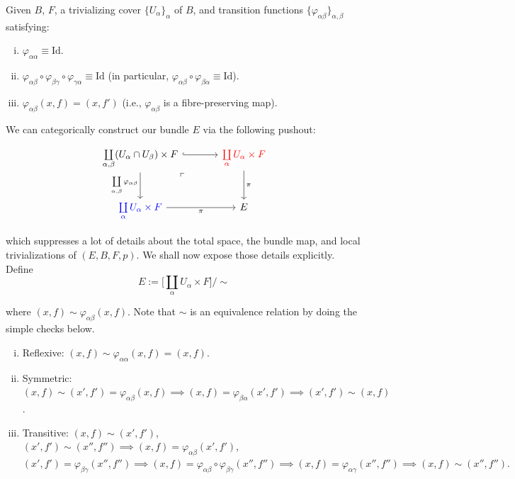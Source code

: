 \documentclass[11pt,a4paper]{article}
\begin{document}
Given $B$, $F$, a trivializing cover $\{U_{\alpha}\}_{\alpha}$ of $B$, and transition functions $\{\varphi_{\alpha \beta}\}_{\alpha, \beta}$ satisfying:
\begin{enumerate}[(i)]
    \item $\varphi_{\alpha \alpha} \equiv \text{Id}$.
    \item $\varphi_{\alpha \beta}\circ \varphi_{\beta \gamma}\circ \varphi_{\gamma \alpha} \equiv \text{Id}$ (in particular, $\varphi_{\alpha \beta}\circ \varphi_{\beta \alpha} \equiv \text{Id}$).
    \item $\varphi_{\alpha \beta}(x, f) = (x, f')$ (i.e., $\varphi_{\alpha \beta}$ is a fibre-preserving map).
\end{enumerate}

We can categorically construct our bundle $E$ via the following pushout:


$$\begin{tikzcd}[column sep = large, row sep = large]
        \coprod\limits_{\alpha, \beta}(U_{\alpha}\cap U_{\beta})\cross F \arrow[hookrightarrow]{r} \arrow[d, "\coprod\limits_{\alpha, \beta} \varphi_{\alpha\beta}"'] \arrow[dr, phantom, "\ulcorner", very near start]
        & \color{red}{\coprod\limits_{\alpha}U_{\alpha} \cross F} \arrow[d, "\pi"]\\
        \color{blue}{\coprod\limits_{\alpha}U_{\alpha} \cross F} \arrow[r, "\pi"'] & E
    \end{tikzcd}$$

which suppresses a lot of details about the total space, the bundle map, and local trivializations of $(E, B, F, p)$. We shall now expose those details explicitly. Define
$$E:= \bigg[\coprod\limits_{\alpha}U_{\alpha}\times F\bigg]\bigg/ \sim$$


where $(x, f) \sim \varphi_{\alpha\beta}(x, f)$. Note that $\sim$ is an equivalence relation by doing the simple checks below.

\begin{enumerate}[(i)]
    \item Reflexive: $(x, f) \sim \varphi_{\alpha\alpha}(x, f) = (x,f)$.
    \item Symmetric: $(x, f) \sim (x', f') = \varphi_{\alpha\beta}(x, f) \implies (x, f) = \varphi_{\beta\alpha}(x', f') \implies (x', f') \sim (x, f)$.

    \item Transitive: $(x, f) \sim (x',f')$, $(x', f') \sim (x'', f'') \implies (x, f) = \varphi_{\alpha\beta}(x',f')$, $(x', f') = \varphi_{\beta\gamma}(x'', f'') \implies (x, f) = \varphi_{\alpha\beta}\circ \varphi_{\beta\gamma}(x'', f'') \implies (x, f) = \varphi_{\alpha\gamma}(x'', f'') \implies (x, f) \sim (x'', f'').$
\end{enumerate}
\end{document}
